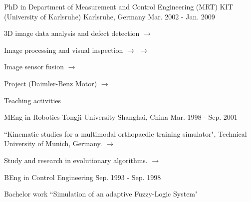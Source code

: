 \documentclass[../cv_xin.tex]{subfiles}
\begin{document}
\begin{cventries}
  \cventry
    {PhD in Department of Measurement and Control Engineering (MRT)} %
    {KIT (University of Karlsruhe)} %
    {Karlsruhe, Germany} %
    {Mar. 2002 - Jan. 2009} %
    {
      \begin{cvitems} %
        \item 3D image data analysis and defect detection \hyperlink{xin2008diss}{$\rightarrow$}
        \item Image processing and visual inspection \hyperlink{xin2009multiscale}{$\rightarrow$} \hyperlink{xin2007evaluation}{$\rightarrow$}
        \item Image sensor fusion \hyperlink{xin2004bildfolgenauswertung}{$\rightarrow$}
        \item Project (Daimler-Benz Motor)  \hyperlink{Xin_Daimler_08}{$\rightarrow$}
        \item Teaching activities
      \end{cvitems}
    }

  \cventry
    {MEng in Robotics} %
    {Tongji University} %
    {Shanghai, China} %
    {Mar. 1998 - Sep. 2001} %
    {
      \begin{cvitems} %
        \item ``Kinematic studies for a multimodal orthopaedic training simulator", Technical University of Munich, Germany. \hyperlink{xin2002KneeSimulator}{$\rightarrow$}
        \item Study and research in evolutionary algorithms. \hyperlink{xin2002AntColony}{$\rightarrow$}
      \end{cvitems}
    }

  \cventry
    {BEng in Control Engineering} %
    {} %
    {} %
    {Sep. 1993 - Sep. 1998} %
    {
      \begin{cvitems} %
        \item Bachelor work ``Simulation of an adaptive Fuzzy-Logic System"
      \end{cvitems}
    }

\end{cventries}
\end{document}
